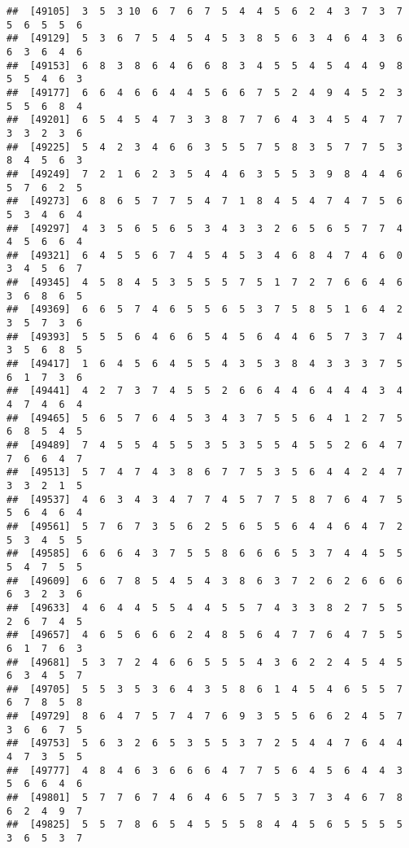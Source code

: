 \documentclass[
]{book}
\begin{document}
\begin{verbatim}
##  [49105]  3  5  3 10  6  7  6  7  5  4  4  5  6  2  4  3  7  3  7  5  6  5  5  6
##  [49129]  5  3  6  7  5  4  5  4  5  3  8  5  6  3  4  6  4  3  6  6  3  6  4  6
##  [49153]  6  8  3  8  6  4  6  6  8  3  4  5  5  4  5  4  4  9  8  5  5  4  6  3
##  [49177]  6  6  4  6  6  4  4  5  6  6  7  5  2  4  9  4  5  2  3  5  5  6  8  4
##  [49201]  6  5  4  5  4  7  3  3  8  7  7  6  4  3  4  5  4  7  7  3  3  2  3  6
##  [49225]  5  4  2  3  4  6  6  3  5  5  7  5  8  3  5  7  7  5  3  8  4  5  6  3
##  [49249]  7  2  1  6  2  3  5  4  4  6  3  5  5  3  9  8  4  4  6  5  7  6  2  5
##  [49273]  6  8  6  5  7  7  5  4  7  1  8  4  5  4  7  4  7  5  6  5  3  4  6  4
##  [49297]  4  3  5  6  5  6  5  3  4  3  3  2  6  5  6  5  7  7  4  4  5  6  6  4
##  [49321]  6  4  5  5  6  7  4  5  4  5  3  4  6  8  4  7  4  6  0  3  4  5  6  7
##  [49345]  4  5  8  4  5  3  5  5  5  7  5  1  7  2  7  6  6  4  6  3  6  8  6  5
##  [49369]  6  6  5  7  4  6  5  5  6  5  3  7  5  8  5  1  6  4  2  3  5  7  3  6
##  [49393]  5  5  5  6  4  6  6  5  4  5  6  4  4  6  5  7  3  7  4  3  5  6  8  5
##  [49417]  1  6  4  5  6  4  5  5  4  3  5  3  8  4  3  3  3  7  5  6  1  7  3  6
##  [49441]  4  2  7  3  7  4  5  5  2  6  6  4  4  6  4  4  4  3  4  4  7  4  6  4
##  [49465]  5  6  5  7  6  4  5  3  4  3  7  5  5  6  4  1  2  7  5  6  8  5  4  5
##  [49489]  7  4  5  5  4  5  5  3  5  3  5  5  4  5  5  2  6  4  7  7  6  6  4  7
##  [49513]  5  7  4  7  4  3  8  6  7  7  5  3  5  6  4  4  2  4  7  3  3  2  1  5
##  [49537]  4  6  3  4  3  4  7  7  4  5  7  7  5  8  7  6  4  7  5  5  6  4  6  4
##  [49561]  5  7  6  7  3  5  6  2  5  6  5  5  6  4  4  6  4  7  2  5  3  4  5  5
##  [49585]  6  6  6  4  3  7  5  5  8  6  6  6  5  3  7  4  4  5  5  5  4  7  5  5
##  [49609]  6  6  7  8  5  4  5  4  3  8  6  3  7  2  6  2  6  6  6  6  3  2  3  6
##  [49633]  4  6  4  4  5  5  4  4  5  5  7  4  3  3  8  2  7  5  5  2  6  7  4  5
##  [49657]  4  6  5  6  6  6  2  4  8  5  6  4  7  7  6  4  7  5  5  6  1  7  6  3
##  [49681]  5  3  7  2  4  6  6  5  5  5  4  3  6  2  2  4  5  4  5  6  3  4  5  7
##  [49705]  5  5  3  5  3  6  4  3  5  8  6  1  4  5  4  6  5  5  7  6  7  8  5  8
##  [49729]  8  6  4  7  5  7  4  7  6  9  3  5  5  6  6  2  4  5  7  3  6  6  7  5
##  [49753]  5  6  3  2  6  5  3  5  5  3  7  2  5  4  4  7  6  4  4  4  7  3  5  5
##  [49777]  4  8  4  6  3  6  6  6  4  7  7  5  6  4  5  6  4  4  3  5  6  6  4  6
##  [49801]  5  7  7  6  7  4  6  4  6  5  7  5  3  7  3  4  6  7  8  6  2  4  9  7
##  [49825]  5  5  7  8  6  5  4  5  5  5  8  4  4  5  6  5  5  5  5  3  6  5  3  7

\end{verbatim}
\end{document}
